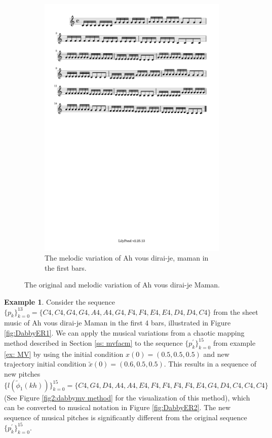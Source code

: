 \documentclass[11pt]{article}
\theoremstyle{definition}
\newtheorem{example}[theorem]{Example}
\begin{document}
\begin{figure}
\begin{subfigure}{\textwidth}
\includegraphics[trim=1cm 26.5cm 8.615cm 0.5cm, clip, scale=0.6]{melody_variation.pdf}
\caption{The melodic variation of Ah vous dirai-je, maman in the first bars.}
\label{fig:MV2}
\end{subfigure}
\caption{The original and melodic variation of Ah vous dirai-je Maman.}
\end{figure}

\begin{example}

Consider the sequence $\{p_k\}_{k=0}^{13} = \{C4, C4, G4, G4, A4, A4, G4, F4, F4, E4, E4, D4, D4, C4 \}$ from the sheet music of Ah vous dirai-je Maman in the first 4 bars, illustrated in Figure \ref{fig:DabbyER1}. 
We can apply the musical variations from a chaotic mapping method described in Section \ref{ss: mvfacm} to the sequence $\{p^\prime_k\}_{k=0}^{15}$ from example \ref{ex: MV} by using the initial condition $x(0) = (0.5,0.5,0.5)$ and new trajectory initial condition $\tilde{x}(0) = (0.6,0.5,0.5)$. 
This results in a sequence of new pitches $\{l(\tilde{\phi}_1(kh))\}_{k = 0}^{15} = \{C4, G4, D4, A4, A4, E4, F4, F4, F4, F4, E4, G4, D4, C4, C4, C4 \} $ (See Figure \ref{fig2:dabbymv method} for the visualization of this method), which can be converted to musical notation in Figure \ref{fig:DabbyER2}. The new sequence of musical pitches is significantly different from the original sequence $\{p^\prime_k\}_{k=0}^{15}$.

\end{example}
\end{document}
